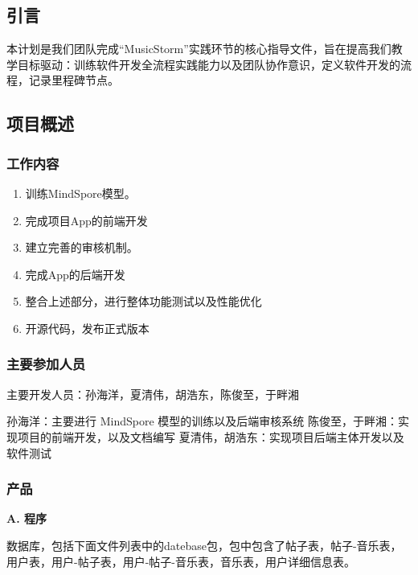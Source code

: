 \documentclass{base}
\numberwithin{figure}{section} %
\begin{document}
\subsection{引言}

本计划是我们团队完成“MusicStorm”实践环节的核心指导文件，旨在提高我们教学目标驱动：训练软件开发全流程实践能力以及团队协作意识​，定义软件开发的流程，记录里程碑节点。

\subsection{项目概述}

\subsubsection{工作内容}

\begin{enumerate}
    \item 训练MindSpore模型。
    \item 完成项目App的前端开发
    \item 建立完善的审核机制。
    \item 完成App的后端开发
    \item 整合上述部分，进行整体功能测试以及性能优化
    \item 开源代码，发布正式版本
\end{enumerate}

\subsubsection{主要参加人员}

主要开发人员：孙海洋，夏清伟，胡浩东，陈俊至，于畔湘

孙海洋：主要进行 MindSpore 模型的训练以及后端审核系统
陈俊至，于畔湘：实现项目的前端开发，以及文档编写
夏清伟，胡浩东：实现项目后端主体开发以及软件测试

\subsubsection{产品}

\textbf{A. 程序}


数据库，包括下面文件列表中的datebase包，包中包含了帖子表，帖子-音乐表，用户表，用户-帖子表，用户-帖子-音乐表，音乐表，用户详细信息表。
\end{document}

